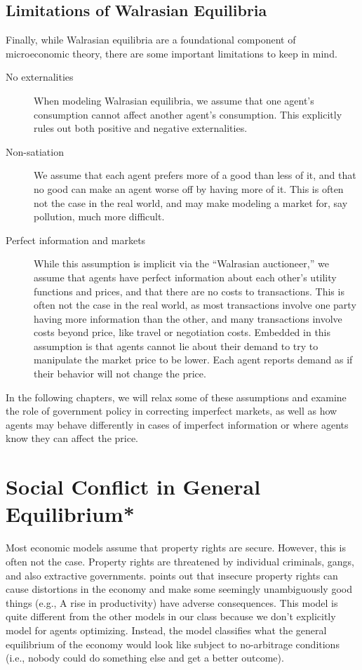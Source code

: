 \subsection*{Limitations of Walrasian Equilibria}
Finally, while Walrasian equilibria are a foundational component of microeconomic theory, there are some important limitations to keep in mind.
\begin{description}
    \item[No externalities] When modeling Walrasian equilibria, we assume that one agent's consumption cannot affect another agent's consumption. This explicitly rules out both positive and negative externalities.
    \item[Non-satiation] We assume that each agent prefers more of a good than less of it, and that no good can make an agent worse off by having more of it. This is often not the case in the real world, and may make modeling a market for, say pollution, much more difficult.
    \item[Perfect information and markets] While this assumption is implicit via the ``Walrasian auctioneer,'' we assume that agents have perfect information about each other's utility functions and prices, and that there are no costs to transactions. This is often not the case in the real world, as most transactions involve one party having more information than the other, and many transactions involve costs beyond price, like travel or negotiation costs. Embedded in this assumption is that agents cannot lie about their demand to try to manipulate the market price to be lower. Each agent reports demand as if their behavior will not change the price.  
\end{description}
In the following chapters, we will relax some of these assumptions and examine the role of government policy in correcting imperfect markets, as well as how agents may behave differently in cases of imperfect information or where agents know they can affect the price. 

\section{Social Conflict in General Equilibrium*}\label{sec:dalbo}
Most economic models assume that property rights are secure. However, this is often not the case. Property rights are threatened by individual criminals, gangs, and also extractive governments. \citet{dalbodalbo} points out that insecure property rights can cause distortions in the economy and make some seemingly unambiguously good things (e.g., A rise in productivity) have adverse consequences. This model is quite different from the other models in our class because we don't explicitly model for agents optimizing. Instead, the model classifies what the general equilibrium of the economy would look like subject to no-arbitrage conditions (i.e., nobody could do something else and get a better outcome).

